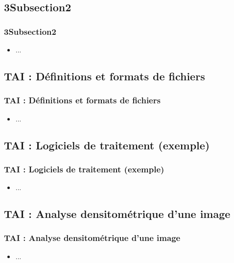 \documentclass{beamer}
\begin{document}
\subsection{ \titleSection3Subsection2 }
\begin{frame}
	\frametitle{ \titleSection3Subsection2 }
	\begin{itemize}
		\item ... 
	\end{itemize}
\end{frame}


\def\titleSection3Subsection2to1{ TAI : D{\'e}finitions et formats de fichiers}
\subsection{ \titleSection3Subsection2to1 }
\begin{frame}
	\frametitle{ \titleSection3Subsection2to1 }
	\begin{itemize}
		\item ... 
	\end{itemize}
\end{frame}

\def\titleSection3Subsection2subsubsection2{ TAI : Logiciels de traitement (exemple)}
\subsection{ \titleSection3Subsection2subsubsection2 }
\begin{frame}
	\frametitle{ \titleSection3Subsection2subsubsection2 }
	\begin{itemize}
		\item ... 
	\end{itemize}
\end{frame}

\def\titleSection3Subsection2subsubsection3{ TAI : Analyse densitom{\'e}trique d'une image}
\subsection{ \titleSection3Subsection2subsubsection3 }
\begin{frame}
	\frametitle{ \titleSection3Subsection2subsubsection3 }
	\begin{itemize}
		\item ... 
	\end{itemize}
\end{frame}

\def\titleSection3Subsection2subsubsection4{ TAI : Imagerie microscopique de fluorescence}
\end{document}
